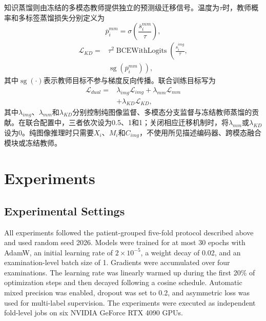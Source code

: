 \documentclass[Afour,sagev,times]{sagej}
\begin{document}
知识蒸馏则由冻结的多模态教师提供独立的预测级迁移信号。温度为$\tau$时，教师概率和多标签蒸馏损失分别定义为
\begin{equation}
\overline{p}_i^{mm}=\sigma\!\left(\frac{\overline{s}_i^{mm}}{\tau}\right),
\end{equation}
\begin{equation}
\begin{aligned}
\mathcal{L}_{KD}={}&\tau^2\operatorname{BCEWithLogits}\!\left(
\frac{s_i^{img}}{\tau},\right.\\
&\left.\operatorname{sg}(\overline{p}_i^{mm})\right),
\end{aligned}
\end{equation}
其中$\operatorname{sg}(\cdot)$表示教师目标不参与梯度反向传播。联合训练目标写为
\begin{equation}
\begin{aligned}
\mathcal{L}_{dual}={}&\lambda_{img}\mathcal{L}_{img}+\lambda_{mm}\mathcal{L}_{mm}\\
&+\lambda_{KD}\mathcal{L}_{KD},
\end{aligned}
\end{equation}
其中$\lambda_{img}$、$\lambda_{mm}$和$\lambda_{KD}$分别控制纯图像监督、多模态分支监督与冻结教师蒸馏的贡献。在联合配置中，三者依次设为0.5、1和1；关闭相应迁移机制时，将$\lambda_{mm}$或$\lambda_{KD}$设为0。纯图像推理时只需要$X_i$、$M_i$和$C_{img}$，不使用所见描述编码器、跨模态融合模块或冻结教师。

\section{Experiments}

\subsection{Experimental Settings}

All experiments followed the patient-grouped five-fold protocol described above and used random seed 2026. Models were trained for at most 30 epochs with AdamW, an initial learning rate of $2\times10^{-5}$, a weight decay of 0.02, and an examination-level batch size of 1. Gradients were accumulated over four examinations. The learning rate was linearly warmed up during the first 20\% of optimization steps and then decayed following a cosine schedule. Automatic mixed precision was enabled, dropout was set to 0.2, and asymmetric loss was used for multi-label supervision. The experiments were executed as independent fold-level jobs on six NVIDIA GeForce RTX 4090 GPUs.
\end{document}
